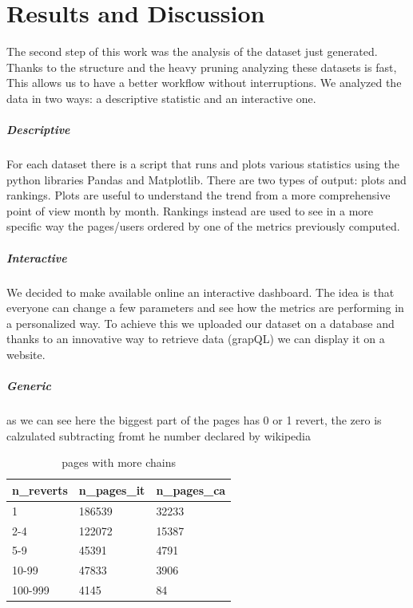 \chapter{Results and Discussion}

The second step of this work was the analysis of the dataset just generated. Thanks to the structure
and the heavy pruning analyzing these datasets is fast, This allows us to have a better workflow
without interruptions. We analyzed the data in two ways: a descriptive statistic and an interactive
one.
\paragraph*{Descriptive}
For each dataset there is a script that runs and plots various statistics using the python libraries
Pandas and Matplotlib. There are two types of output: plots and rankings. 
Plots are useful to understand the trend from a more comprehensive point of view month by month.  
Rankings instead are used to see in a more specific way the pages/users ordered by one of the
metrics previously computed. 
\paragraph*{Interactive}
We decided to make available online an interactive dashboard. The idea is
that everyone can change a few parameters and see how the metrics are performing in a personalized
way. To achieve this we uploaded our dataset on a database and thanks to an innovative way to retrieve
data (grapQL) we can display it on a website. 

\paragraph*{Generic }
as we can see here the biggest part of the pages has 0 or 1 revert, the zero is calzulated
subtracting fromt he number declared by wikipedia 
\begin{table}[H]
    \centering
    \begin{tabularx}{\columnwidth}{@{}Xll@{}}
        \midrule
        \textbf{n\_reverts} & \textbf{n\_pages\_it} & \textbf{n\_pages\_ca}  \\ \toprule
        1   & 186539& 32233 \\
        2-4 & 122072& 15387 \\
        5-9 & 45391& 4791 \\
        10-99 & 47833& 3906 \\
        100-999 & 4145& 84\\

        \bottomrule
    \end{tabularx}
    
    \caption{pages with more chains \label{table:reverts}}
\end{table}
